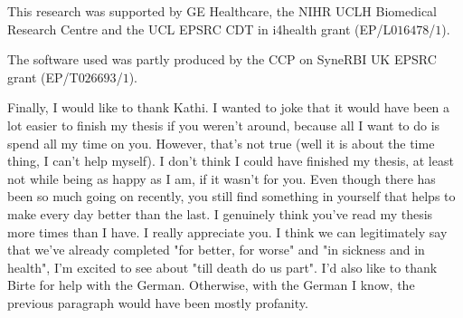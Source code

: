 \begin{acknowledgements}
    This research was supported by \gls{GE} Healthcare, the \gls{NIHR} \gls{UCLH} Biomedical Research Centre and the \gls{UCL} \gls{EPSRC} \gls{CDT} in \gls{i4health} grant (EP/L$016478$/$1$).
    
    The software used was partly produced by the \gls{CCP} on \gls{SyneRBI} \gls{UK} \gls{EPSRC} grant (EP/T$026693$/$1$).

    Finally, I would like to thank Kathi. I wanted to joke that it would have been a lot easier to finish my thesis if you weren't around, because all I want to do is spend all my time on you. However, that's not true (well it is about the time thing, I can't help myself). I don't think I could have finished my thesis, at least not while being as happy as I am, if it wasn't for you. Even though there has been so much going on recently, you still find something in yourself that helps to make every day better than the last. I genuinely think you've read my thesis more times than I have. I really appreciate you. I think we can legitimately say that we've already completed "for better, for worse" and "in sickness and in health", I'm excited to see about "till death do us part". I'd also like to thank Birte for help with the German. Otherwise, with the German I know, the previous paragraph would have been mostly profanity.
    
%     
%     
\end{acknowledgements}

